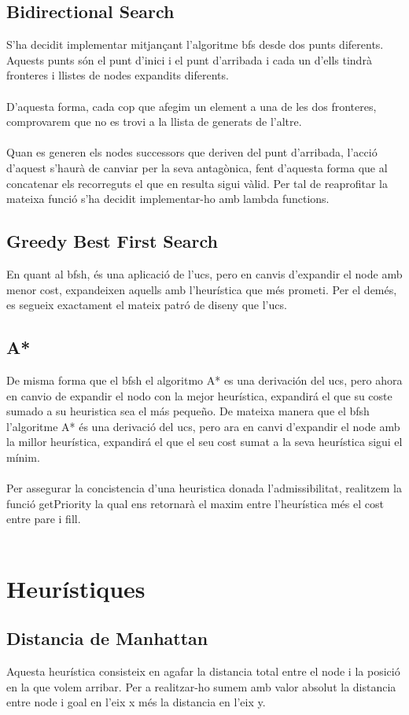 \documentclass{article}
\begin{document}
\subsection{Bidirectional Search}
S'ha decidit implementar mitjançant l'algoritme bfs desde dos punts diferents. Aquests punts són el punt d'inici i el punt d'arribada i cada un d'ells tindrà fronteres i llistes de nodes expandits diferents. 
\\\\
D'aquesta forma, cada cop que afegim un element a una de les dos fronteres, comprovarem que no es trovi a la llista de generats de l'altre.
\\\\
Quan es generen els nodes successors  que deriven del punt d'arribada, l'acció d'aquest s'haurà de canviar per la seva antagònica, fent d'aquesta forma que al concatenar els recorreguts el que en resulta sigui vàlid. Per tal de reaprofitar la mateixa funció s'ha decidit implementar-ho amb lambda functions.
\subsection{Greedy Best First Search}
En quant al bfsh, és una aplicació de l'ucs, pero en canvis d'expandir el node amb menor cost, expandeixen aquells amb l'heurística que més prometi. Per el demés, es segueix exactament el mateix patró de diseny que l'ucs.
\subsection{A*}
De misma forma que el bfsh el algoritmo A* es una derivación del ucs, pero ahora en canvio de expandir el nodo con la mejor heurística, expandirá el que su coste sumado a su heuristica sea el más pequeño.
De mateixa manera que el bfsh l'algoritme A* és una derivació del ucs, pero ara en canvi d'expandir el node amb la millor heurística, expandirá el que el seu cost sumat a la seva heurística sigui el mínim.
\\\\
Per assegurar la concistencia d'una heuristica donada l'admissibilitat, realitzem la funció getPriority la qual ens retornarà el maxim entre l'heurística més el cost entre pare i fill.
\\\\
\section{Heurístiques}
\subsection{Distancia de Manhattan}
Aquesta heurística consisteix en agafar la distancia total entre el node i la posició en la que volem arribar. Per a realitzar-ho sumem amb valor absolut la distancia entre node i goal en l'eix x més la distancia en l'eix y. 
\end{document}
